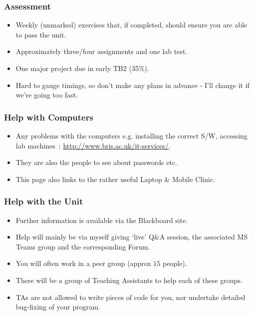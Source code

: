 \begin{frame}%
\frametitle{Assessment}
\begin{itemize}[<+->]
\item Weekly (unmarked) exercises that, if completed, should ensure you are able to pass the unit.
\item Approximately three/four assignments and one lab test.
\item One major project due in early TB2 (35\%).
\item Hard to gauge timings, so don't make any plans in advance -
I'll change it if we're going too fast.
\end{itemize}
\end{frame}


\begin{frame}%
\frametitle{Help with Computers}
\begin{itemize}[<+->]
\item Any problems with the computers e.g. installing the correct S/W, accessing lab machines~: \url{http://www.bris.ac.uk/it-services/}.
\item They are also the people to see about passwords etc.
\item This page also links to the rather useful Laptop \& Mobile Clinic.
\end{itemize}
\end{frame}

\begin{frame}%
\frametitle{Help with the Unit}
\begin{itemize}[<+->]
\item Further information is available via the Blackboard site.
\item Help will mainly be via myself giving `live' Q\&A session, the associated MS Teams group and the corresponding Forum.
\item You will often work in a peer group (approx $15$ people).
\item There will be a group of Teaching Assistants to help each of these groups.
\item TAs are not allowed to write pieces of code for you,
nor undertake detailed bug-fixing of your program.
\end{itemize}
\end{frame}
